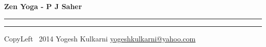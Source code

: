 

\usepackage{beamerarticle} %



\begin{center}
     \Large{\textbf{Zen Yoga - P J Saher}}  %
\end{center}
\rule{\linewidth}{0.25pt}
\raggedright
\footnotesize
\begin{multicols}{3}




\rule{0.3\linewidth}{0.25pt}

\scriptsize
CopyLeft \textcopyleft\ 2014 Yogesh Kulkarni
\href{http://www.yogeshkulkarni.com}{yogeshkulkarni@yahoo.com}

\end{multicols}

